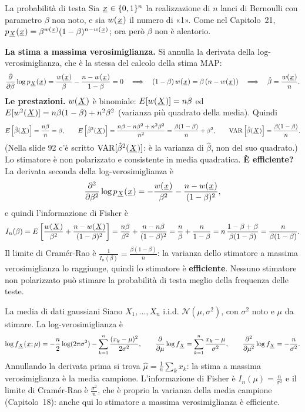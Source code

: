 \begin{esempio}{La probabilità di testa}
Sia ${\mkern1mu\underline{x}\mkern1mu} \in \{0, 1\}^n$ la realizzazione di $n$ lanci di Bernoulli con parametro $\beta$ non noto, e sia
$w({\mkern1mu\underline{x}\mkern1mu})$ il numero di «1». Come nel Capitolo~21, $p_{{\mkern1mu\underline{X}\mkern1mu}}({\mkern1mu\underline{x}\mkern1mu}) = \beta^{w({\mkern1mu\underline{x}\mkern1mu})} (1 - \beta)^{n -
w({\mkern1mu\underline{x}\mkern1mu})}$; ora però $\beta$ non è aleatorio.

\textbf{La stima a massima verosimiglianza.} Si annulla la derivata della log-verosimiglianza, che è la stessa del
calcolo della stima MAP:
\[ \frac{\partial}{\partial\beta} \log p_{{\mkern1mu\underline{X}\mkern1mu}}({\mkern1mu\underline{x}\mkern1mu}) = \frac{w({\mkern1mu\underline{x}\mkern1mu})}{\beta} - \frac{n - w({\mkern1mu\underline{x}\mkern1mu})}{1 -
   \beta} = 0 \quad\Longrightarrow\quad (1 - \beta)\, w({\mkern1mu\underline{x}\mkern1mu}) = \beta\, (n - w({\mkern1mu\underline{x}\mkern1mu})) \quad\Longrightarrow\quad
   \hat\beta = \frac{w({\mkern1mu\underline{x}\mkern1mu})}{n} . \]
\textbf{Le prestazioni.} $w({\mkern1mu\underline{X}\mkern1mu})$ è binomiale: $E[w({\mkern1mu\underline{X}\mkern1mu})] = n\beta$ ed $E[w^2({\mkern1mu\underline{X}\mkern1mu})] = n\beta(1 - \beta) +
n^2\beta^2$ (varianza più quadrato della media). Quindi
\[ E\left[ \hat\beta({\mkern1mu\underline{X}\mkern1mu}) \right] = \frac{n\beta}{n} = \beta , \qquad E\left[ \hat\beta^2({\mkern1mu\underline{X}\mkern1mu}) \right] =
   \frac{n\beta - n\beta^2 + n^2\beta^2}{n^2} = \frac{\beta(1 - \beta)}{n} + \beta^2 , \qquad \mathrm{VAR}\left[
   \hat\beta({\mkern1mu\underline{X}\mkern1mu}) \right] = \frac{\beta(1 - \beta)}{n} . \]
(Nella slide 92 c'è scritto $\mathrm{VAR}[\hat\beta^2({\mkern1mu\underline{X}\mkern1mu})]$: è la varianza di $\hat\beta$, non del suo quadrato.)
Lo stimatore è non polarizzato e consistente in media quadratica. \textbf{È efficiente?} La derivata seconda della
log-verosimiglianza è
\[ \frac{\partial^2}{\partial\beta^2} \log p_{{\mkern1mu\underline{X}\mkern1mu}}({\mkern1mu\underline{x}\mkern1mu}) = -\frac{w({\mkern1mu\underline{x}\mkern1mu})}{\beta^2} - \frac{n -
   w({\mkern1mu\underline{x}\mkern1mu})}{(1 - \beta)^2} , \]
e quindi l'informazione di Fisher è
\[ I_n(\beta) = E\left[ \frac{w({\mkern1mu\underline{X}\mkern1mu})}{\beta^2} + \frac{n - w({\mkern1mu\underline{X}\mkern1mu})}{(1 - \beta)^2} \right] = \frac{n\beta}{\beta^2}
   + \frac{n - n\beta}{(1 - \beta)^2} = \frac{n}{\beta} + \frac{n}{1 - \beta} = n\, \frac{1 - \beta + \beta}{\beta(1 -
   \beta)} = \frac{n}{\beta(1 - \beta)} . \]
Il limite di Cramér-Rao è $\frac{1}{I_n(\beta)} = \frac{\beta(1 - \beta)}{n}$: la varianza dello stimatore a massima
verosimiglianza lo raggiunge, quindi lo stimatore è \textbf{efficiente}. Nessuno stimatore non polarizzato può stimare la
probabilità di testa meglio della frequenza delle teste.
\end{esempio}

\begin{esempio}{La media di dati gaussiani}
Siano $X_1, \ldots, X_n$ i.i.d. $\mathcal{N}(\mu, \sigma^2)$, con $\sigma^2$ noto e $\mu$ da stimare. La
log-verosimiglianza è
\[ \log f_{{\mkern1mu\underline{X}\mkern1mu}}({\mkern1mu\underline{x}\mkern1mu}; \mu) = -\frac{n}{2} \log(2\pi\sigma^2) - \sum_{k=1}^{n} \frac{(x_k - \mu)^2}{2\sigma^2} ,
   \qquad \frac{\partial}{\partial\mu} \log f_{{\mkern1mu\underline{X}\mkern1mu}} = \sum_{k=1}^{n} \frac{x_k - \mu}{\sigma^2} , \qquad
   \frac{\partial^2}{\partial\mu^2} \log f_{{\mkern1mu\underline{X}\mkern1mu}} = -\frac{n}{\sigma^2} . \]
Annullando la derivata prima si trova $\hat\mu = \frac{1}{n}\sum_k x_k$: la stima a massima verosimiglianza è la media
campione. L'informazione di Fisher è $I_n(\mu) = \frac{n}{\sigma^2}$ e il limite di Cramér-Rao è $\frac{\sigma^2}{n}$, che
è proprio la varianza della media campione (Capitolo~18): anche qui lo stimatore a massima verosimiglianza è efficiente.
\end{esempio}

